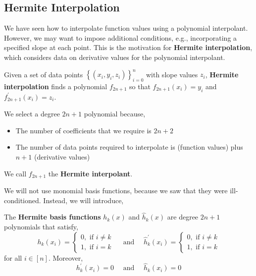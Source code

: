 \subsection{Hermite Interpolation}
We have seen how to interpolate function values using a polynomial interpolant. However, we may want to impose additional conditions, e.g., incorporating a specified slope at each point. This is the motivation for \textbf{Hermite interpolation}, which considers data on derivative values for the polynomial interpolant.

\begin{defn}
    \sloppy Given a set of data points $\left\{\left(x_i, y_i, z_i\right)\right\}_{i=0}^n$ with slope values $z_i$, \textbf{Hermite interpolation} finds a polynomial $f_{2 n+1}$ so that $f_{2 n+1}(x_i) = y_i$ and $f_{2 n+1}^{\prime}\left(x_i\right)=z_i$.
\end{defn}

\begin{rmk}
We select a degree $2n + 1$ polynomial because,
\begin{itemize}
    \item The number of coefficients that we require is $2n + 2$
    \item The number of data points required to interpolate is  (function values) plus $n+1$ (derivative values)  
\end{itemize}
\end{rmk}

\begin{marginfigure}
    We call $f_{2 n+1}$ the \textbf{Hermite interpolant}.
\end{marginfigure}

\noindent We will not use monomial basis functions, because we saw that they were ill-conditioned. Instead, we will introduce,

\begin{defn}
    \sloppy The \textbf{Hermite basis functions} $h_k(x)$ and $\hat{h}_k(x)$ are degree $2n + 1$ polynomials that satisfy,
    \[
    h_k\left(x_i\right)=\left\{\begin{array}{l}
    0, \text { if } i \neq k \\
    1, \text { if } i=k
    \end{array}\right.
    \quad \text{ and } \quad \hat{h}_k^{\prime}\left(x_i\right)=\left\{\begin{array}{l}
    0, \text { if } i \neq k \\
    1, \text { if } i=k
    \end{array}\right.
    \]
    for all $i \in [n]$. Moreover,
    \[h_k^{\prime}\left(x_i\right)=0 \quad \text{ and } \quad \hat{h}_k\left(x_i\right)=0\]
\end{defn}

